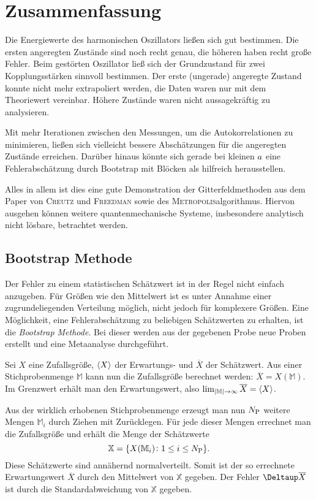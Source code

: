 \chapter{Zusammenfassung}

Die Energiewerte des harmonischen Oszillators ließen sich gut bestimmen. Die
ersten angeregten Zustände sind noch recht genau, die höheren haben recht große
Fehler. Beim gestörten Oszillator ließ sich der Grundzustand für zwei
Kopplungsstärken sinnvoll bestimmen. Der erste (ungerade) angeregte Zustand
konnte nicht mehr extrapoliert werden, die Daten waren nur mit dem Theoriewert
vereinbar. Höhere Zustände waren nicht aussagekräftig zu analysieren.

Mit mehr Iterationen zwischen den Messungen, um die Autokorrelationen zu
minimieren, ließen sich vielleicht bessere Abschätzungen für die angeregten
Zustände erreichen. Darüber hinaus könnte sich gerade bei kleinen $a$
eine Fehlerabschätzung durch Bootstrap mit Blöcken als hilfreich herausstellen.

Alles in allem ist dies eine gute Demonstration der Gitterfeldmethoden aus dem
Paper von \textsc{Creutz} und \textsc{Freedman} sowie des
\textsc{Metropolis}algorithmus. Hiervon ausgehen können weitere
quantenmechanische Systeme, insbesondere analytisch nicht lösbare, betrachtet
werden.

\begin{appendix}
    \chapter{Bootstrap Methode}
    \label{sec:bootstrap}

    Der Fehler zu einem statistischen Schätzwert ist in der Regel nicht einfach
    anzugeben. Für Größen wie den Mittelwert ist es unter Annahme einer
    zugrundeliegenden Verteilung möglich, nicht jedoch für komplexere Größen.
    Eine Möglichkeit, eine Fehlerabschätzung zu beliebigen Schätzwerten zu
    erhalten, ist die \emph{Bootstrap Methode}. Bei dieser werden aus der
    gegebenen Probe neue Proben erstellt und eine Metaanalyse durchgeführt.

    Sei $X$ eine Zufallsgröße, $\langle X \rangle$ der Erwartungs- und $\overline X$
    der Schätzwert. Aus einer Stichprobenmenge $\mathbb M$ kann nun die
    Zufallsgröße berechnet werden: $\overline X = X(\mathbb M)$. Im Grenzwert
    erhält man den Erwartungswert, also $\lim_{|\mathbb M| \to \infty}
    \overline X = \langle X \rangle$.

    Aus der wirklich erhobenen Stichprobenmenge erzeugt man nun
    $N_\text P$ weitere Mengen $\mathbb M_i$ durch Ziehen mit
    Zurücklegen. Für jede dieser Mengen errechnet man die Zufallsgröße und
    erhält die Menge der Schätzwerte
    \[
        \mathbb X = \{ X(\mathbb M_i) \colon 1 \leq i \leq N_\text P \}.
    \]
    Diese Schätzwerte sind annähernd normalverteilt. Somit ist der so
    errechnete Erwartungswert $\overline X$ durch den Mittelwert von $\mathbb
    X$ gegeben. Der Fehler $\Deltaup \overline X$ ist durch die
    Standardabweichung von $\mathbb X$ gegeben.
\end{appendix}

